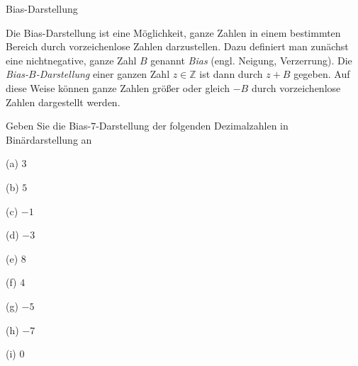 \begin{exercise}{Bias-Darstellung}

\begin{body}
Die Bias-Darstellung ist eine Möglichkeit, ganze Zahlen in einem bestimmten Bereich durch vorzeichenlose Zahlen darzustellen. Dazu definiert man zunächst eine nichtnegative, ganze Zahl $B$ genannt \emph{Bias} (engl. Neigung, Verzerrung). Die \emph{Bias-$B$-Darstellung} einer ganzen Zahl $z \in \mathbb{Z}$ ist dann durch $z + B$ gegeben. 
Auf diese Weise können ganze Zahlen größer oder gleich $-B$ durch vorzeichenlose Zahlen dargestellt werden.

Geben Sie die Bias-$7$-Darstellung der folgenden Dezimalzahlen in Binärdarstellung an
\begin{center}
\begin{minipage}{0.3\textwidth}
\begin{parts}
\item[(a)] $3$
\item[(b)] $5$
\item[(c)] $-1$
\end{parts}
\end{minipage}
\begin{minipage}{0.3\textwidth}
\begin{parts}
\item[(d)] $-3$
\item[(e)] $8$
\item[(f)] $4$
\end{parts}
\end{minipage}
\begin{minipage}{0.3\textwidth}
\begin{parts}
\item[(g)] $-5$
\item[(h)] $-7$
\item[(i)] $0$
\end{parts}
\end{minipage}
\end{center}
\end{body}



\end{exercise}
